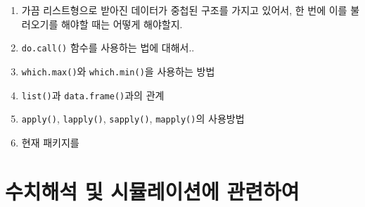 \documentclass{article}
\begin{document}
\begin{enumerate}
\item 가끔 리스트형으로 받아진 데이터가 중첩된 구조를 가지고 있어서, 한 번에 이를 불러오기를 해야할 때는 어떻게 해야할지.

\item \texttt{do.call()} 함수를 사용하는 법에 대해서..

\item \texttt{which.max()}와 \texttt{which.min()}을 사용하는 방법 

\item \texttt{list()}과 \texttt{data.frame()}과의 관계

\item \texttt{apply()}, \texttt{lapply()}, \texttt{sapply()}, \texttt{mapply()}의 사용방법

\item 현재 패키지를



% 


\end{enumerate}

%
%

\section{수치해석 및 시뮬레이션에 관련하여}
\end{document}
